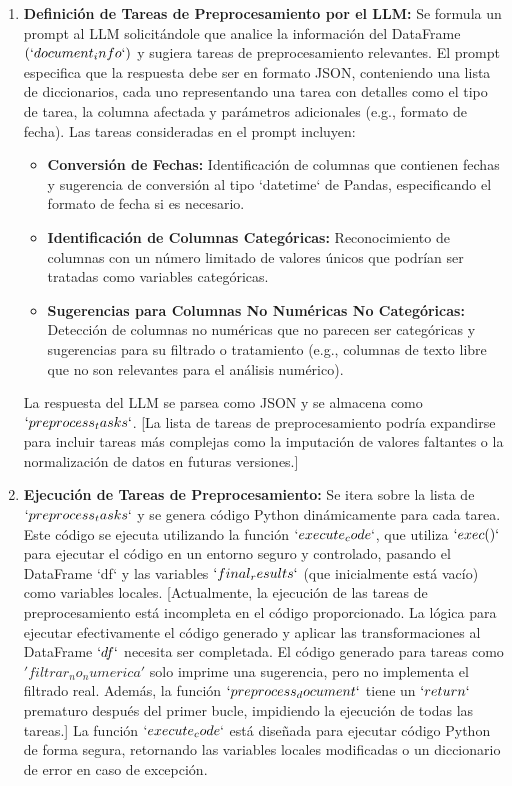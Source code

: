 \begin{enumerate}
	\item \textbf{Definición de Tareas de Preprocesamiento por el LLM:} Se formula un prompt al LLM solicitándole que analice la información del DataFrame $(`document_info`)$ y sugiera tareas de preprocesamiento relevantes.  El prompt especifica que la respuesta debe ser en formato JSON,  conteniendo una lista de diccionarios, cada uno representando una tarea con detalles como el tipo de tarea, la columna afectada y parámetros adicionales (e.g., formato de fecha).  Las tareas consideradas en el prompt incluyen:
	\begin{itemize}
		\item \textbf{Conversión de Fechas:}  Identificación de columnas que contienen fechas y sugerencia de conversión al tipo `datetime` de Pandas, especificando el formato de fecha si es necesario.
		\item \textbf{Identificación de Columnas Categóricas:}  Reconocimiento de columnas con un número limitado de valores únicos que podrían ser tratadas como variables categóricas.
		\item \textbf{Sugerencias para Columnas No Numéricas No Categóricas:}  Detección de columnas no numéricas que no parecen ser categóricas y sugerencias para su filtrado o tratamiento (e.g., columnas de texto libre que no son relevantes para el análisis numérico).
	\end{itemize}
	La respuesta del LLM se parsea como JSON y se almacena como $`preprocess_tasks`$. [La lista de tareas de preprocesamiento podría expandirse para incluir tareas más complejas como la imputación de valores faltantes o la normalización de datos en futuras versiones.]
	
	\item \textbf{Ejecución de Tareas de Preprocesamiento:}  Se itera sobre la lista de $`preprocess_tasks`$ y se genera código Python dinámicamente para cada tarea.  Este código se ejecuta utilizando la función $`execute_code`$, que utiliza $`exec()`$ para ejecutar el código en un entorno seguro y controlado, pasando el DataFrame `df` y las variables $`final_results`$ (que inicialmente está vacío) como variables locales.  [Actualmente, la ejecución de las tareas de preprocesamiento está incompleta en el código proporcionado.  La lógica para ejecutar efectivamente el código generado y aplicar las transformaciones al DataFrame $`df`$ necesita ser completada.  El código generado para tareas como $'filtrar_no_numerica'$ solo imprime una sugerencia, pero no implementa el filtrado real.  Además, la función $`preprocess_document`$ tiene un $`return`$ prematuro después del primer bucle, impidiendo la ejecución de todas las tareas.] La función $`execute_code`$ está diseñada para ejecutar código Python de forma segura, retornando las variables locales modificadas o un diccionario de error en caso de excepción.
	\end{enumerate}

